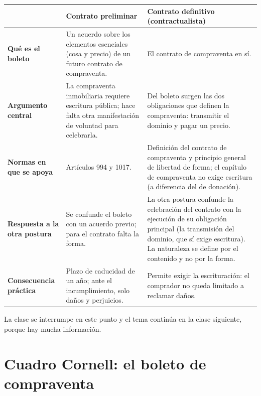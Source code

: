 \documentclass[12pt,oneside]{book}
\begin{document}
\begin{table}[H]
\centering
\small
\begin{tabularx}{\textwidth}{@{}>{\raggedright\arraybackslash}p{}>{\raggedright\arraybackslash}X>{\raggedright\arraybackslash}X@{}}
\toprule
 & \textbf{Contrato preliminar} & \textbf{Contrato definitivo (contractualista)} \\
\midrule
\textbf{Qué es el boleto} & Un acuerdo sobre los elementos esenciales (cosa y precio) de un futuro contrato de compraventa. & El contrato de compraventa en sí. \\
\textbf{Argumento central} & La compraventa inmobiliaria requiere escritura pública; hace falta otra manifestación de voluntad para celebrarla. & Del boleto surgen las dos obligaciones que definen la compraventa: transmitir el dominio y pagar un precio. \\
\textbf{Normas en que se apoya} & Artículos 994 y 1017. & Definición del contrato de compraventa y principio general de libertad de forma; el capítulo de compraventa no exige escritura (a diferencia del de donación). \\
\textbf{Respuesta a la otra postura} & Se confunde el boleto con un acuerdo previo; para el contrato falta la forma. & La otra postura confunde la celebración del contrato con la ejecución de su obligación principal (la transmisión del dominio, que sí exige escritura). La naturaleza se define por el contenido y no por la forma. \\
\textbf{Consecuencia práctica} & Plazo de caducidad de un año; ante el incumplimiento, solo daños y perjuicios. & Permite exigir la escrituración: el comprador no queda limitado a reclamar daños. \\
\bottomrule
\end{tabularx}
\end{table}

La clase se interrumpe en este punto y el tema continúa en la clase siguiente, porque hay mucha información.

\section{Cuadro Cornell: el boleto de compraventa}
\end{document}
